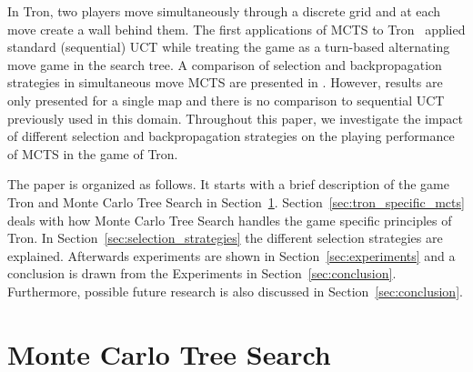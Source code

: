 \documentclass{article}
\begin{document}
In Tron, two players move simultaneously through a discrete grid and at each move create a wall behind them. 
The first applications of MCTS to Tron~\cite{teuling_tron,tron_cig} applied standard (sequential) UCT while treating the game as a turn-based alternating move game in the search tree. A comparison of selection and backpropagation strategies in simultaneous move MCTS are presented in \cite{cig_paper}. However, results are only presented for a single map and there is no comparison to sequential UCT previously used in this domain.
Throughout this paper, we investigate the impact of different selection and backpropagation strategies on the playing performance of MCTS in the game of Tron.

The paper is organized as follows.
It starts with a brief description of the game Tron and Monte Carlo Tree Search in Section~\ref{sec:background}. 
Section~\ref{sec:tron_specific_mcts} deals with how Monte Carlo Tree Search handles the game specific principles of Tron. In Section~\ref{sec:selection_strategies} the different selection strategies are explained. Afterwards experiments are shown in Section~\ref{sec:experiments} and a conclusion is drawn from the Experiments in Section~\ref{sec:conclusion}. Furthermore, possible future research is also discussed in Section~\ref{sec:conclusion}.

\section{Monte Carlo Tree Search}
\label{sec:background}
\end{document}
